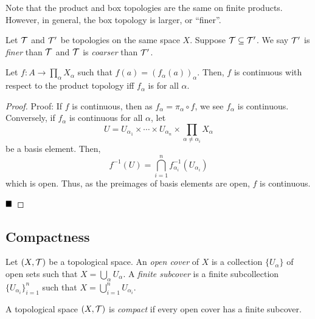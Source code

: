 Note that the product and box topologies are the same on finite products. However, in general, the box topology is larger, or ``finer''.

\begin{definition}
    Let $\cal{T}$ and $\cal{T}'$ be topologies on the same space $X$. Suppose $\cal{T} \subseteq \cal{T}'$. We say $\cal{T}'$ is \emph{finer} than $\cal{T}$ and $\cal{T}$ is \emph{coarser} than $\cal{T}'$.
\end{definition}

\begin{lemma}
    Let $f : A \to \prod_{\alpha} X_{\alpha}$ such that $f(a) = (f_{\alpha}(a))_{\alpha}$. Then, $f$ is continuous with respect to the product topology iff $f_{\alpha}$ is for all $\alpha$.
\end{lemma}
\begin{proof}{Proof:}
    If $f$ is continuous, then as $f_{\alpha} = \pi_{\alpha} \circ f$, we see $f_{\alpha}$ is continuous.\\

    Conversely, if $f_{\alpha}$ is continuous for all $\alpha$, let
    \[ U = U_{\alpha_1} \times \cdots \times U_{\alpha_n} \times \prod_{\alpha \neq \alpha_i} X_{\alpha} \]
    be a basis element. Then,
    \[ f^{-1}(U) = \bigcap_{i = 1}^{n} f_{\alpha_i}^{-1}(U_{\alpha_i}) \]
    which is open. Thus, as the preimages of basis elements are open, $f$ is continuous.

    $\qed$
\end{proof}

\subsection*{Compactness}
\sectionspace

\begin{definition}
    Let $(X, \cal{T})$ be a topological space. An \emph{open cover} of $X$ is a collection $\{U_{\alpha}\}$ of open sets such that $X = \bigcup_{\alpha} U_{\alpha}$. A \emph{finite subcover} is a finite subcollection $\{U_{\alpha_i}\}_{i = 1}^{n}$ such that $X = \bigcup_{i = 1}^{n} U_{\alpha_i}$.
\end{definition}

\begin{definition}
    A topological space $(X, \cal{T})$ is \emph{compact} if every open cover has a finite subcover.
\end{definition}

